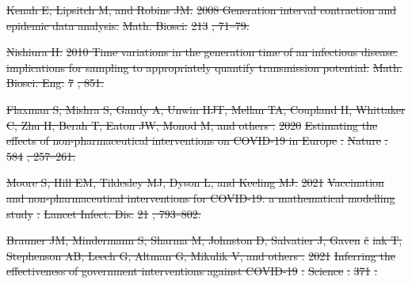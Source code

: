 \documentclass[12pt]{article}
\providecommand{\DIFdeltex}[1]{{\protect\color{red}\sout{#1}}}                      %
\providecommand{\DIFdel}[1]{\texorpdfstring{\DIFdeltex{#1}}{}} %
\begin{document}
\DIFdel{Kenah E, Lipsitch M, and Robins JM.
}%
\DIFdel{2008 Generation interval contraction and epidemic data analysis.
}%
\DIFdel{Math. Biosci.}%
\DIFdel{213}%
\DIFdel{, 71--79.
}%

\DIFdel{Nishiura H.
}%
\DIFdel{2010 Time variations in the generation time of an infectious disease:
  implications for sampling to appropriately quantify transmission potential.
}%
\DIFdel{Math. Biosci. Eng.}%
\DIFdel{7}%
\DIFdel{, 851.
}%

\DIFdel{Flaxman S, Mishra S, Gandy A, Unwin HJT, Mellan TA, Coupland H, Whittaker C,
  Zhu H, Berah T, Eaton JW, Monod M, and others .
}%
\DIFdel{2020 }%
\DIFdel{Estimating the effects of non-pharmaceutical interventions on
  COVID-19 in Europe}%
\DIFdel{.
}%
\DIFdel{Nature}%
\DIFdel{.
}%
\DIFdel{584}%
\DIFdel{, 257--261.
}%

\DIFdel{Moore S, Hill EM, Tildesley MJ, Dyson L, and Keeling MJ.
}%
\DIFdel{2021 }%
\DIFdel{Vaccination and non-pharmaceutical interventions for COVID-19:
  a mathematical modelling study}%
\DIFdel{.
}%
\DIFdel{Lancet Infect. Dis.}%
\DIFdel{21}%
\DIFdel{, 793--802.
}%

\DIFdel{Brauner JM, Mindermann S, Sharma M, Johnston D, Salvatier J, Gaven}%
\DIFdel{\v{c}}%
\DIFdel{iak T,
  Stephenson AB, Leech G, Altman G, Mikulik V, and others .
}%
\DIFdel{2021 }%
\DIFdel{Inferring the effectiveness of government interventions against
  COVID-19}%
\DIFdel{.
}%
\DIFdel{Science}%
\DIFdel{.
}%
\DIFdel{371}%
\DIFdel{.
}%
\end{document}
